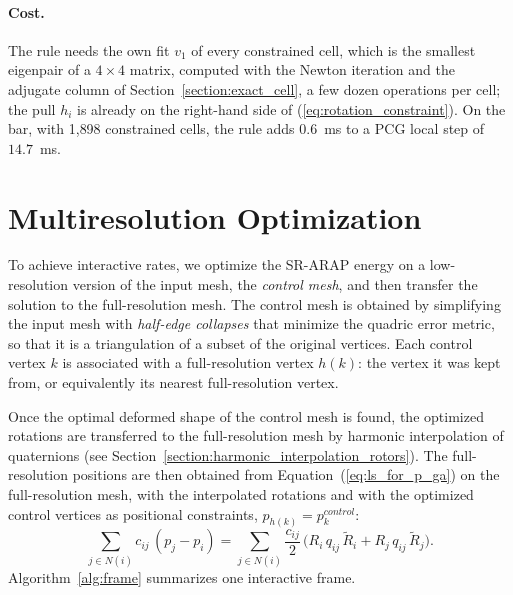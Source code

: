 \documentclass{birkjour}
\theoremstyle{remark}
\numberwithin{equation}{section}
\begin{document}
\paragraph{Cost.} The rule needs the own fit $v_1$ of every constrained cell, which is the smallest eigenpair of a $4 \times 4$ matrix, computed with the Newton iteration and the adjugate column of Section~\ref{section:exact_cell}, a few dozen operations per cell; the pull $h_i$ is already on the right-hand side of (\ref{eq:rotation_constraint}). On the bar, with 1{,}898 constrained cells, the rule adds $0.6$~ms to a PCG local step of $14.7$~ms.

\section{Multiresolution Optimization}

To achieve interactive rates, we optimize the SR-ARAP energy on a low-resolution version of the input mesh, the \emph{control mesh}, and then transfer the solution to the full-resolution mesh. The control mesh is obtained by simplifying the input mesh with \emph{half-edge collapses} that minimize the quadric error metric, so that it is a triangulation of a subset of the original vertices. Each control vertex $k$ is associated with a full-resolution vertex $h(k)$: the vertex it was kept from, or equivalently its nearest full-resolution vertex.

Once the optimal deformed shape of the control mesh is found, the optimized rotations are transferred to the full-resolution mesh by harmonic interpolation of quaternions (see Section~\ref{section:harmonic_interpolation_rotors}). The full-resolution positions are then obtained from Equation~(\ref{eq:ls_for_p_ga}) on the full-resolution mesh, with the interpolated rotations and with the optimized control vertices as positional constraints, $p_{h(k)} = p^{control}_k$:
\begin{equation*}
\sum_{j \in N(i)} c_{ij} \, (p_j - p_i) = \sum_{j \in N(i)} \frac{c_{ij}}{2} \, \big( R_i \, q_{ij} \, \tilde R_i + R_j \, q_{ij} \, \tilde R_j \big).
\end{equation*}
Algorithm~\ref{alg:frame} summarizes one interactive frame.
\end{document}
